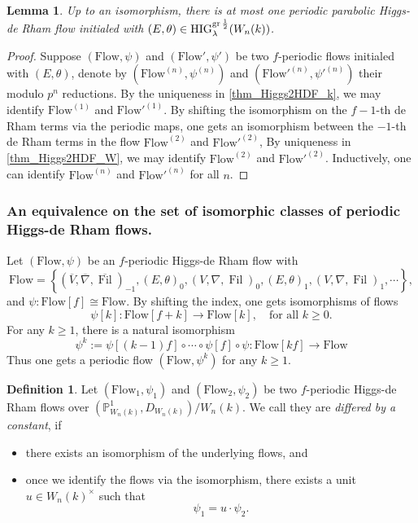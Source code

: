 \documentclass[12pt,twoside]{book}
\theoremstyle{plain}
\newtheorem{lemma}[lemma]{Lemma}
\theoremstyle{definition}
\newtheorem{definition}[definition]{Definition}
\theoremstyle{remark}
\DeclareMathOperator\Fil{Fil}
\numberwithin{equation}{section}
\def\High{{\mathrm{HIG}^{{\rm gr}\,{1\over 2}}_{\lambda}}}
\def\Flow{\mathrm{Flow}}
\def\BBn{{(\mathbb P^1_{W_n(k)}, D_{W_n(k)})/W_n(k)}}
\begin{document}
\begin{lemma}
Up to an isomorphism, there is at most one periodic parabolic Higgs-de Rham flow initialed with $(E,\theta)\in \High(W_n(k))$.
\end{lemma}

\begin{proof}
Suppose $(\Flow,\psi)$ and $(\Flow',\psi')$ be two $f$-periodic flows initialed with $(E,\theta)$, denote by $(\Flow^{(n)},\psi^{(n)})$ and $(\Flow'^{(n)},\psi'^{(n)})$ their modulo $p^n$ reductions. By the uniqueness in \autoref{thm_Higgs2HDF_k}, we may identify $\Flow^{(1)}$ and $\Flow'^{(1)}$. By shifting the isomorphism on the $f-1$-th de Rham terms via the periodic maps, one gets an isomorphism between the $-1$-th de Rham terms in the flow $\Flow^{(2)}$ and $\Flow'^{(2)}$, By uniqueness in \autoref{thm_Higgs2HDF_W}, we may identify $\Flow^{(2)}$ and $\Flow'^{(2)}$. Inductively, one can identify $\Flow^{(n)}$ and $\Flow'^{(n)}$ for all $n$.
\end{proof}

\subsubsection{An equivalence on the set of isomorphic classes of periodic Higgs-de Rham flows.}

Let $(\Flow,\psi)$ be an $f$-periodic Higgs-de Rham flow with
\[\Flow = \left\{
(\overline{V},\overline{\nabla},\overline{\Fil})_{-1},
(E,\theta)_{0},(V,\nabla,\Fil)_{0},(E,\theta)_{1},(V,\nabla,\Fil)_{1},\cdots\right\},\]
and $\psi\colon \Flow[f]\cong \Flow$. By shifting the index, one gets isomorphisms of flows
\[\psi[k]\colon \Flow[f+k] \rightarrow \Flow[k],\quad \text{for all $k\geq0$}.\]
For any $k\geq1$, there is a natural isomorphism
\[\psi^k:=\psi[(k-1)f]\circ\cdots\circ\psi[f]\circ\psi\colon \Flow[kf]\rightarrow\Flow\]
Thus one gets a periodic flow $(\Flow,\psi^k)$ for any $k\geq1$.

\begin{definition} \label{def_diffByConstant}
Let $(\Flow_1,\psi_1)$ and $(\Flow_2,\psi_2)$ be two $f$-periodic Higgs-de Rham flows over $\BBn$. We call they are \emph{differed by a constant}, if
\begin{itemize}
\item there exists an isomorphism of the underlying flows, and
\item once we identify the flows via the isomorphism, there exists a unit $u\in W_n(k)^\times$ such that
\[\psi_1 = u\cdot \psi_2.\]
\end{itemize}
\end{definition}
\end{document}
